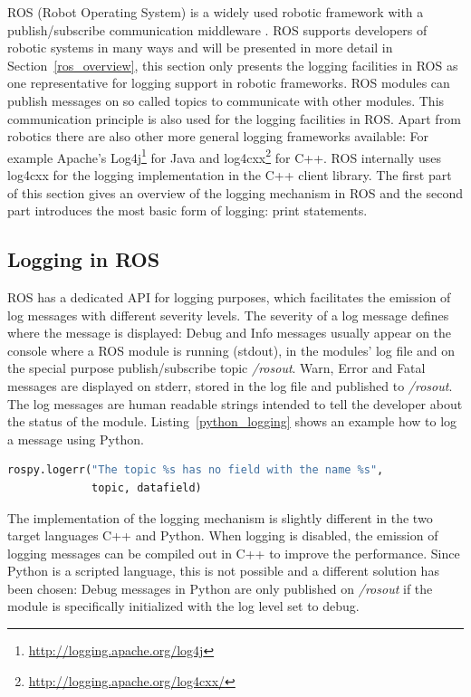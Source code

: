 ROS (Robot Operating System) is a widely used robotic framework \cite{Foote2012} with a publish/subscribe communication middleware \cite{Quigley2009}. ROS supports developers of robotic systems in many ways and will be presented in more detail in Section~\ref{ros_overview}, this section only presents the logging facilities in ROS as one representative for logging support in robotic frameworks. ROS modules can publish messages on so called topics to communicate with other modules. This communication principle is also used for the logging facilities in ROS. Apart from robotics there are also other more general logging frameworks available: For example Apache's Log4j\footnote{\url{http://logging.apache.org/log4j}} for Java and log4cxx\footnote{\url{http://logging.apache.org/log4cxx/}} for C++. ROS internally uses log4cxx for the logging implementation in the C++ client library. The first part of this section gives an overview of the logging mechanism in ROS and the second part introduces the most basic form of logging: print statements.

\subsection{Logging in ROS}
\label{ros_logging}

ROS has a dedicated API for logging purposes, which facilitates the emission of log messages with different severity levels. The severity of a log message defines where the message is displayed: Debug and Info messages usually appear on the console where a ROS module is running (stdout), in the modules' log file and on the special purpose publish/subscribe topic \emph{/rosout}. Warn, Error and Fatal messages are displayed on stderr, stored in the log file and published to \emph{/rosout}. The log messages are human readable strings intended to tell the developer about the status of the module. Listing~\ref{python_logging} shows an example how to log a message using Python.

\begin{lstlisting}[frame=single,caption={ROS logging example in Python.},label=python_logging,language=Python]
rospy.logerr("The topic %s has no field with the name %s",
             topic, datafield)
\end{lstlisting}

The implementation of the logging mechanism is slightly different in the two target languages C++ and Python. When logging is disabled, the emission of logging messages can be compiled out in C++ to improve the performance. Since Python is a scripted language, this is not possible and a different solution has been chosen: Debug messages in Python are only published on \emph{/rosout} if the module is specifically initialized with the log level set to debug.

